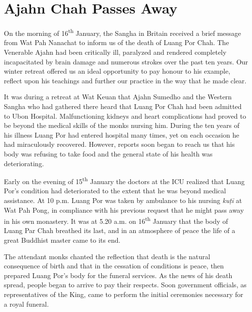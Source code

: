 
\chapter{Ajahn Chah Passes Away}

On the morning of 16\textsuperscript{th} January, the Sangha in Britain received a brief
message from Wat Pah Nanachat to inform us of the death of Luang Por
Chah. The Venerable Ajahn had been critically ill, paralyzed and
rendered completely incapacitated by brain damage and numerous strokes
over the past ten years. Our winter retreat offered us an ideal
opportunity to pay honour to his example, reflect upon his teachings and
further our practice in the way that he made clear. 

It was during a retreat at Wat Keuan that Ajahn Sumedho and the
Western Sangha who had gathered there heard that Luang Por Chah had been
admitted to Ubon Hospital. Malfunctioning kidneys and heart
complications had proved to be beyond the medical skills of the monks
nursing him. During the ten years of his illness Luang Por had entered
hospital many times, yet on each occasion he had miraculously recovered. 
However, reports soon began to reach us that his body was refusing to
take food and the general state of his health was deteriorating. 

Early on the evening of 15\textsuperscript{th} January the doctors at the ICU realized
that Luang Por's condition had deteriorated to the extent that he was
beyond medical assistance. At 10 p.m. Luang Por was taken by ambulance to
his nursing \emph{kuṭī} at Wat Pah Pong, in compliance with his previous
request that he might pass away in his own monastery. It was at 5.20 a.m.
on 16\textsuperscript{th} January that the body of Luang Par Chah breathed its last, and
in an atmosphere of peace the life of a great Buddhist master came to
its end. 

The attendant monks chanted the reflection that death is the natural
consequence of birth and that in the cessation of conditions is peace, 
then prepared Luang Por's body for the funeral services. As the news of
his death spread, people began to arrive to pay their respects. Soon
government officials, as representatives of the King, came to perform
the initial ceremonies necessary for a royal funeral. 

